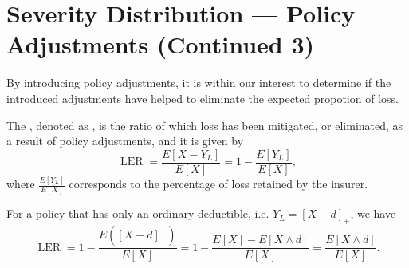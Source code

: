 \documentclass[notoc,notitlepage]{tufte-book}
\DeclareMathOperator{\LER}{LER }
\begin{document}
\section{Severity Distribution --- Policy Adjustments (Continued 3)}%
\label{sec:severity_distribution_policy_adjustments_continued_3}

By introducing policy adjustments, it is within our interest to determine if the introduced adjustments have helped to eliminate the expected propotion of loss.

\begin{defn}\label{defn:loss_elimination_ratio}
  The , denoted as \hldefn{$\LER$}, is the ratio of which loss has been mitigated, or eliminated, as a result of policy adjustments, and it is given by
  \begin{equation*}
    \LER = \frac{E[ X - Y_L ]}{E[X]} = 1 - \frac{E[Y_L]}{E[X]},
  \end{equation*}
  where $\frac{E[Y_L]}{E[X]}$ corresponds to the percentage of loss retained by the insurer.
\end{defn}

\begin{eg}
  For a policy that has only an ordinary deductible, i.e. $Y_L = {[X - d]}_+$, we have
  \begin{equation*}
    \LER = 1 - \frac{E( {[X - d]}_+ )}{E[X]} = 1 - \frac{E[X] - E[X \land d]}{E[X]} = \frac{E[X \land d]}{E[X]}.
  \end{equation*}
\end{eg}
\end{document}
